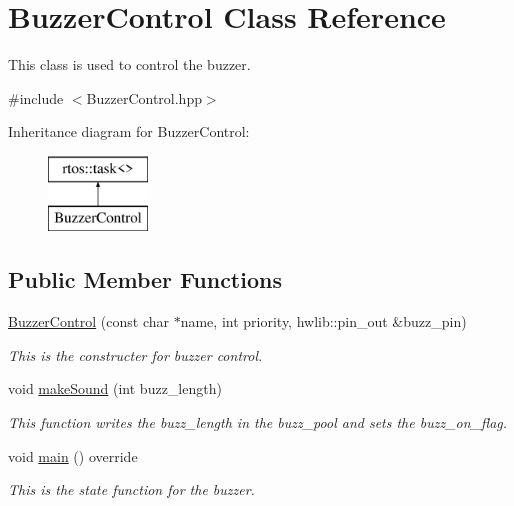 \hypertarget{class_buzzer_control}{}\section{Buzzer\+Control Class Reference}
\label{class_buzzer_control}


This class is used to control the buzzer.  




{\ttfamily \#include $<$Buzzer\+Control.\+hpp$>$}

Inheritance diagram for Buzzer\+Control\+:\begin{figure}[H]
\begin{center}
\leavevmode
\includegraphics[height=2.000000cm]{class_buzzer_control}
\end{center}
\end{figure}
\subsection*{Public Member Functions}
\begin{DoxyCompactItemize}
\item 
\mbox{\hyperlink{class_buzzer_control_a25b3a51e33513aeeb0beb137463bbe70}{Buzzer\+Control}} (const char $\ast$name, int priority, hwlib\+::pin\+\_\+out \&buzz\+\_\+pin)
\begin{DoxyCompactList}\small\item\em This is the constructer for buzzer control. \end{DoxyCompactList}\item 
\mbox{\label{class_buzzer_control_a2c485c8888d861efae8461a87a47685f}} 
void \mbox{\hyperlink{class_buzzer_control_a2c485c8888d861efae8461a87a47685f}{make\+Sound}} (int buzz\+\_\+length)
\begin{DoxyCompactList}\small\item\em This function writes the buzz\+\_\+length in the buzz\+\_\+pool and sets the buzz\+\_\+on\+\_\+flag. \end{DoxyCompactList}\item 
void \mbox{\hyperlink{class_buzzer_control_ae249e78ba5c0399e8b14091a0a8254eb}{main}} () override
\begin{DoxyCompactList}\small\item\em This is the state function for the buzzer. \end{DoxyCompactList}\end{DoxyCompactItemize}


